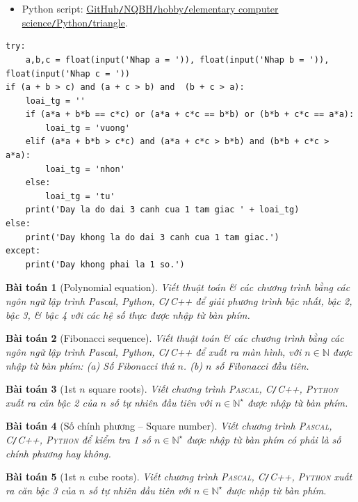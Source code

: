 \documentclass{article}
\newtheorem{baitoan}{Bài toán}
\begin{document}
\begin{itemize}
	\item Python script: \href{https://github.com/NQBH/hobby/blob/master/elementary_computer_science/Python/triangle.py}{GitHub\texttt{/}NQBH\texttt{/}hobby\texttt{/}elementary computer science\texttt{/}Python\texttt{/}triangle}.
\end{itemize}

\begin{verbatim}
try:
    a,b,c = float(input('Nhap a = ')), float(input('Nhap b = ')), float(input('Nhap c = '))
if (a + b > c) and (a + c > b) and  (b + c > a):
    loai_tg = ''
    if (a*a + b*b == c*c) or (a*a + c*c == b*b) or (b*b + c*c == a*a):
        loai_tg = 'vuong'
    elif (a*a + b*b > c*c) and (a*a + c*c > b*b) and (b*b + c*c > a*a):
        loai_tg = 'nhon'
    else:
        loai_tg = 'tu'
    print('Day la do dai 3 canh cua 1 tam giac ' + loai_tg)
else: 
    print('Day khong la do dai 3 canh cua 1 tam giac.')			
except:
    print('Day khong phai la 1 so.')
\end{verbatim}

\begin{baitoan}[Polynomial equation]
	Viết thuật toán \& các chương trình bằng các ngôn ngữ lập trình {\sf Pascal, Python, C\texttt{/}C++} để giải phương trình bậc nhất, bậc 2, bậc 3, \& bậc 4 với các hệ số thực được nhập từ bàn phím.
\end{baitoan}

\begin{baitoan}[Fibonacci sequence]
	Viết thuật toán \& các chương trình bằng các ngôn ngữ lập trình {\sf Pascal, Python, C\texttt{/}C++} để xuất ra màn hình, với $n\in\mathbb{N}$ được nhập từ bàn phím: (a) Số Fibonacci thứ $n$. (b) $n$ số Fibonacci đầu tiên.
\end{baitoan}

\begin{baitoan}[1st $n$ square roots]
	Viết chương trình \textsc{Pascal, C\texttt{/}C++, Python} xuất ra căn bậc 2 của $n$ số tự nhiên đầu tiên với $n\in\mathbb{N}^\star$ được nhập từ bàn phím.
\end{baitoan}

\begin{baitoan}[Số chính phương -- Square number]
	Viết chương trình \textsc{Pascal, C\texttt{/}C++, Python} để kiểm tra 1 số $n\in\mathbb{N}^\star$ được nhập từ bàn phím có phải là số chính phương hay không.
\end{baitoan}

\begin{baitoan}[1st $n$ cube roots]
	Viết chương trình \textsc{Pascal, C\texttt{/}C++, Python} xuất ra căn bậc 3 của $n$ số tự nhiên đầu tiên với $n\in\mathbb{N}^\star$ được nhập từ bàn phím.
\end{baitoan}
\end{document}

